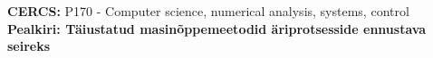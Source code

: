 \begin{abstracts}
	
	

\textbf{CERCS:} P170 -  Computer science, numerical analysis, systems, control \\

{  \bfseries \Large {Pealkiri: }\large T\"aiustatud masin\~oppemeetodid \"ariprotsesside ennustava seireks}\\[0.5cm]
	


\end{abstracts}
